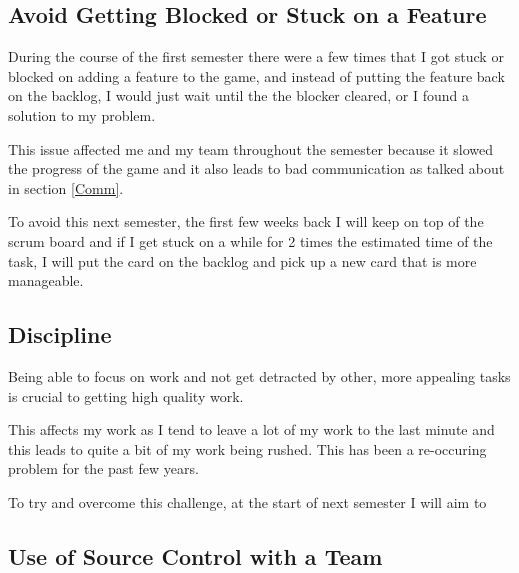 \documentclass{scrartcl}
\begin{document}
\subsection{Avoid Getting Blocked or Stuck on a Feature} \label{Avoid}

During the course of the first semester there were a few times that I got stuck or blocked on adding a feature to the game, and instead of putting the feature back on the backlog, I would just wait until the the blocker cleared, or I found a solution to my problem.



This issue affected me and my team throughout the semester because it slowed the progress of the game and it also leads to bad communication as talked about in section \ref{Comm}.


To avoid this next semester, the first few weeks back I will keep on top of the scrum board and if I get stuck on a while for 2 times the estimated time of the task, I will put the card on the backlog and pick up a new card that is more manageable.

\par






\subsection{Discipline}

Being able to focus on work and not get detracted by other, more appealing tasks is crucial to getting high quality work.

This affects my work as I tend to leave a lot of my work to the last minute and this leads to quite a bit of my work being rushed.  
This has been a re-occuring problem for the past few years.

To try and overcome this challenge, at the start of next semester I will aim to 

\par




\subsection{Use of Source Control with a Team}




\par






\end{document}
